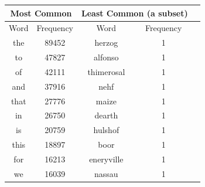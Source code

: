 \documentclass[a4paper, 12pt]{article}
\begin{document}
\noindent

\begin{table}[h]
\centering
\label{Most and Least Common Words}
\begin{tabular}{|c|c|c|c|c|}
\multicolumn{2}{c}{Most Common} & \multicolumn{2}{l}{Least Common (a subset)} \\
\hline
Word                 & Frequency        &  Word & Frequency      \\
\hline
the                  & 89452                & herzog &1\\
to                  & 47827                 &   alfonso &1\\
of                    & 42111                  & thimerosal&1\\
and                   & 37916                    & nehf&1\\
that            & 27776                   & maize&1\\
in                   & 26750                   & dearth&1\\
is                   & 20759                   &hulshof&1\\
this                    & 18897                   & boor&1\\
for                   & 16213                    &eneryville& 1\\
we                & 16039                 & nassau & 1 \\
\hline
\end{tabular}
\end{table}
\noindent


\end{document}
